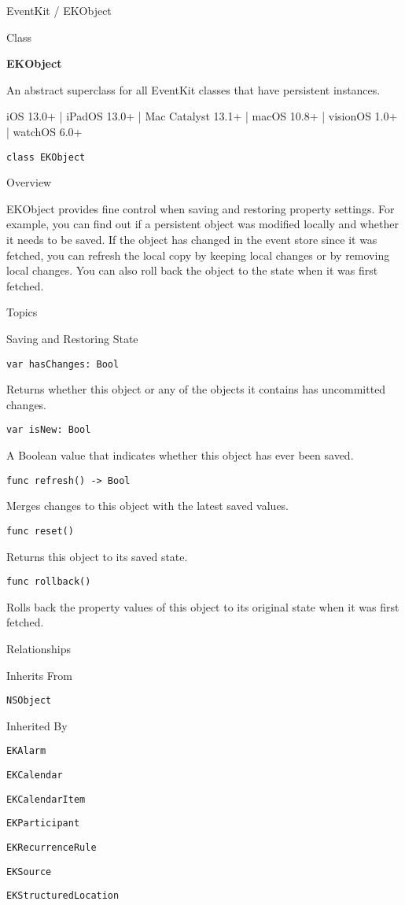 \documentclass{article}
\title{}
\author{}
\date{}
\begin{document}
EventKit / EKObject

Class

\textbf{EKObject}

An abstract superclass for all EventKit classes that have persistent instances.

iOS 13.0+ | iPadOS 13.0+ | Mac Catalyst 13.1+ | macOS 10.8+ | visionOS 1.0+ | watchOS 6.0+

\texttt{class EKObject}

Overview

EKObject provides fine control when saving and restoring property settings. For example, you can find out if a
persistent object was modified locally and whether it needs to be saved. If the object has changed in the event
store since it was fetched, you can refresh the local copy by keeping local changes or by removing local changes.
You can also roll back the object to the state when it was first fetched.

Topics

Saving and Restoring State

\texttt{var hasChanges: Bool}

Returns whether this object or any of the objects it contains has uncommitted changes.

\texttt{var isNew: Bool}

A Boolean value that indicates whether this object has ever been saved.

\texttt{func refresh() -> Bool}

Merges changes to this object with the latest saved values.

\texttt{func reset()}

Returns this object to its saved state.

\texttt{func rollback()}

Rolls back the property values of this object to its original state when it was first fetched.

Relationships

Inherits From

\texttt{NSObject}

Inherited By

\texttt{EKAlarm}

\texttt{EKCalendar}

\texttt{EKCalendarItem}

\texttt{EKParticipant}

\texttt{EKRecurrenceRule}

\texttt{EKSource}

\texttt{EKStructuredLocation}
\end{document}
